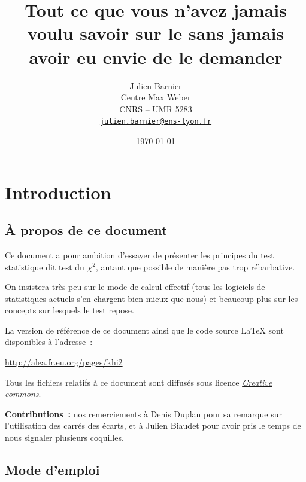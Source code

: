 \documentclass[a4paper,10pt,twoside,francais]{report}
\title{Tout ce que vous n'avez jamais voulu savoir sur le \chid sans
  jamais avoir eu envie de le demander}
\author{Julien Barnier\\ Centre Max Weber\\
  CNRS -- UMR 5283\\ \href{mailto:julien.barnier@ens-lyon.fr}{\texttt{julien.barnier@ens-lyon.fr}}}
\date{\today{}}
\newcommand{\chid}{$\chi^2$\xspace}
\begin{document}
\renewcommand\chaptername{Partie}

\maketitle
\thispagestyle{empty}

\pagestyle{fancy} 
\renewcommand{\chaptermark}[1]{\markboth{#1}{}}
\renewcommand{\sectionmark}[1]{\markright{\thesection.\ #1}}
\fancyhead{}
\fancyhead[RO,LE]{\thepage}
\fancyhead[RE]{\nouppercase{\leftmark}}
\fancyhead[LO]{\nouppercase{\rightmark}}
\fancyfoot{}

\tableofcontents


\sloppy

\setlength{\parskip}{1.5ex}


\chapter{Introduction}

\section{À propos de ce document}

Ce document a pour ambition d'essayer de présenter les principes du
test statistique dit \og test du \chid \fg{}, autant que possible de
manière pas trop rébarbative.

On insistera très peu sur le mode de calcul effectif (tous les
logiciels de statistiques actuels s'en chargent bien mieux que nous)
et beaucoup plus sur les concepts sur lesquels le test repose.

La version de référence de ce document ainsi que le code source
\LaTeX{} sont disponibles à l'adresse~:

\url{http://alea.fr.eu.org/pages/khi2}

Tous les fichiers relatifs à ce document sont diffusés sous licence
\href{http://creativecommons.org/licenses/by/2.0/fr/}{\textit{Creative commons}}.

\textbf{Contributions~: } nos remerciements à Denis Duplan pour sa
remarque sur l'utilisation des carrés des écarts, et à Julien Biaudet
pour avoir pris le temps de nous signaler plusieurs coquilles.

\section{Mode d'emploi}
\end{document}

